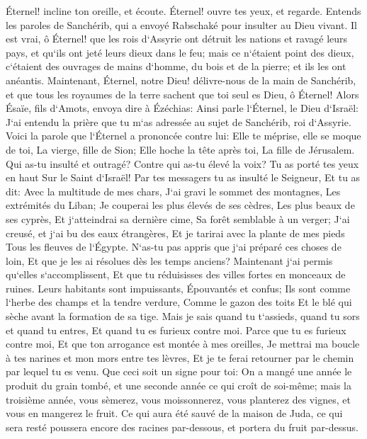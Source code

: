 \verse Éternel! incline ton oreille, et écoute. Éternel! ouvre tes yeux, et regarde. Entends les paroles de Sanchérib, qui a envoyé Rabschaké pour insulter au Dieu vivant. 
\verse Il est vrai, ô Éternel! que les rois d`Assyrie ont détruit les nations et ravagé leurs pays, 
\verse et qu`ils ont jeté leurs dieux dans le feu; mais ce n`étaient point des dieux, c`étaient des ouvrages de mains d`homme, du bois et de la pierre; et ils les ont anéantis. 
\verse Maintenant, Éternel, notre Dieu! délivre-nous de la main de Sanchérib, et que tous les royaumes de la terre sachent que toi seul es Dieu, ô Éternel! 
\verse Alors Ésaïe, fils d`Amots, envoya dire à Ézéchias: Ainsi parle l`Éternel, le Dieu d`Israël: J`ai entendu la prière que tu m`as adressée au sujet de Sanchérib, roi d`Assyrie. 
\verse Voici la parole que l`Éternel a prononcée contre lui: Elle te méprise, elle se moque de toi, La vierge, fille de Sion; Elle hoche la tête après toi, La fille de Jérusalem. 
\verse Qui as-tu insulté et outragé? Contre qui as-tu élevé la voix? Tu as porté tes yeux en haut Sur le Saint d`Israël! 
\verse Par tes messagers tu as insulté le Seigneur, Et tu as dit: Avec la multitude de mes chars, J`ai gravi le sommet des montagnes, Les extrémités du Liban; Je couperai les plus élevés de ses cèdres, Les plus beaux de ses cyprès, Et j`atteindrai sa dernière cime, Sa forêt semblable à un verger; 
\verse J`ai creusé, et j`ai bu des eaux étrangères, Et je tarirai avec la plante de mes pieds Tous les fleuves de l`Égypte. 
\verse N`as-tu pas appris que j`ai préparé ces choses de loin, Et que je les ai résolues dès les temps anciens? Maintenant j`ai permis qu`elles s`accomplissent, Et que tu réduisisses des villes fortes en monceaux de ruines. 
\verse Leurs habitants sont impuissants, Épouvantés et confus; Ils sont comme l`herbe des champs et la tendre verdure, Comme le gazon des toits Et le blé qui sèche avant la formation de sa tige. 
\verse Mais je sais quand tu t`assieds, quand tu sors et quand tu entres, Et quand tu es furieux contre moi. 
\verse Parce que tu es furieux contre moi, Et que ton arrogance est montée à mes oreilles, Je mettrai ma boucle à tes narines et mon mors entre tes lèvres, Et je te ferai retourner par le chemin par lequel tu es venu. 
\verse Que ceci soit un signe pour toi: On a mangé une année le produit du grain tombé, et une seconde année ce qui croît de soi-même; mais la troisième année, vous sèmerez, vous moissonnerez, vous planterez des vignes, et vous en mangerez le fruit. 
\verse Ce qui aura été sauvé de la maison de Juda, ce qui sera resté poussera encore des racines par-dessous, et portera du fruit par-dessus. 
